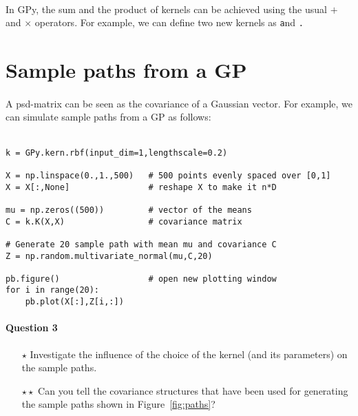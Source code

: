 \documentclass{article}
\newcommand{\mintinline}[1]{\colorbox{bg}{\lstinline[basicstyle=\ttfamily]{#1}}}
\begin{document}
\paragraph{}
In GPy, the sum and the product of kernels can be achieved using the usual $+$ and $\times$ operators. For example, we can define two new kernels as \texttt and \texttt.

\section{Sample paths from a GP}
\paragraph{}
A psd-matrix can be seen as the covariance of a Gaussian vector. For example, we
can simulate sample paths from a GP as follows: \\ \ \\
\begin{verbatim}
k = GPy.kern.rbf(input_dim=1,lengthscale=0.2)

X = np.linspace(0.,1.,500)   # 500 points evenly spaced over [0,1]
X = X[:,None]                # reshape X to make it n*D

mu = np.zeros((500))         # vector of the means
C = k.K(X,X)                 # covariance matrix

# Generate 20 sample path with mean mu and covariance C
Z = np.random.multivariate_normal(mu,C,20)

pb.figure()                  # open new plotting window
for i in range(20):
    pb.plot(X[:],Z[i,:])
\end{verbatim}

\paragraph{Question 3}
\begin{itemize}
	\item[$\star$] Investigate the influence of the choice of the kernel (and its parameters) on the sample paths.
	\item[$\star \star$] Can you tell the covariance structures that have been used for generating the sample paths shown in Figure~\ref{fig:paths}? 
\end{itemize}
\end{document}
